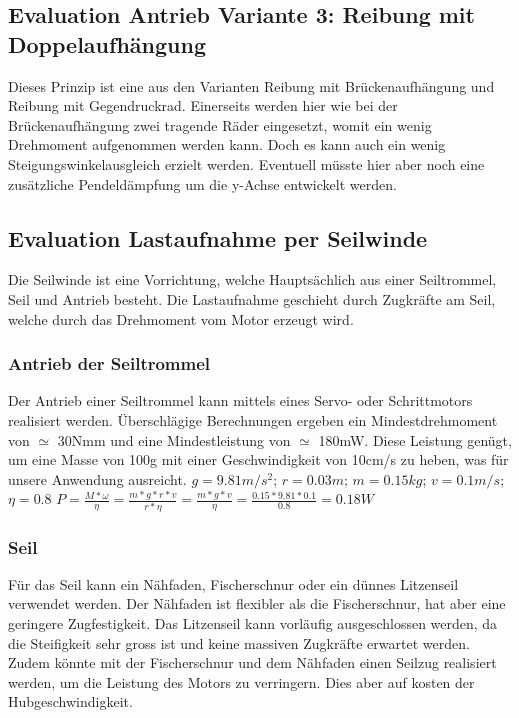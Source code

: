 \documentclass[a4paper]{report}
\begin{document}
\subsection{Evaluation Antrieb Variante 3: Reibung mit Doppelaufhängung}
\label{app:ssec:EvalAntrieb3}
Dieses Prinzip ist eine aus den Varianten Reibung mit Brückenaufhängung und Reibung mit Gegendruckrad. Einerseits werden hier wie bei der Brückenaufhängung zwei tragende Räder eingesetzt, womit ein wenig Drehmoment aufgenommen werden kann. Doch es kann auch ein wenig Steigungswinkelausgleich erzielt werden. Eventuell müsste hier aber noch eine zusätzliche Pendeldämpfung um die y-Achse entwickelt werden.


\subsection{Evaluation Lastaufnahme per Seilwinde}
\label{app:ssec:EvalLast}
Die Seilwinde ist eine Vorrichtung, welche Hauptsächlich aus einer Seiltrommel, Seil und Antrieb besteht. Die Lastaufnahme geschieht durch Zugkräfte am Seil, welche durch das Drehmoment vom Motor erzeugt wird.

\subsubsection{Antrieb der Seiltrommel}
\label{app:ssub:Seilantrieb}
Der Antrieb einer Seiltrommel kann mittels eines Servo- oder Schrittmotors realisiert werden. Überschlägige Berechnungen ergeben ein Mindestdrehmoment von $\simeq$ 30Nmm und eine Mindestleistung von $\simeq$ 180mW. Diese Leistung genügt, um eine Masse von 100g mit einer Geschwindigkeit von 10cm/s zu heben, was für unsere Anwendung ausreicht.
\newline \newline
$g=9.81m/s^{2}$;\hspace{5mm} $r=0.03m$;\hspace{5mm} $m=0.15kg$;\hspace{5mm} $v=0.1m/s$;\hspace{5mm} $\eta=0.8$ \newline \newline
$P=\frac{M*\omega}{\eta}=\frac{m*g*r*v}{r*\eta}=\frac{m*g*v}{\eta}=\frac{0.15*9.81*0.1}{0.8}=0.18W$

\subsubsection{Seil}
\label{app:ssec:Seil}
Für das Seil kann ein Nähfaden, Fischerschnur oder ein dünnes Litzenseil verwendet werden. Der Nähfaden ist flexibler als die Fischerschnur, hat aber eine geringere Zugfestigkeit. Das Litzenseil kann vorläufig ausgeschlossen werden, da die Steifigkeit sehr gross ist und keine massiven Zugkräfte erwartet werden. Zudem könnte mit der Fischerschnur und dem Nähfaden einen Seilzug realisiert werden, um die Leistung des Motors zu verringern. Dies aber auf kosten der Hubgeschwindigkeit.
\end{document}
